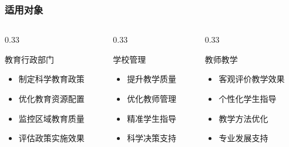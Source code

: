 \documentclass[aspectratio=169]{beamer}
\begin{document}
\begin{frame}
    \frametitle{适用对象}
    \begin{columns}
        \begin{column}{0.33\textwidth}
            \begin{block}{教育行政部门}
                \begin{itemize}
                    \item 制定科学教育政策
                    \item 优化教育资源配置
                    \item 监控区域教育质量
                    \item 评估政策实施效果
                \end{itemize}
            \end{block}
        \end{column}
        
        \begin{column}{0.33\textwidth}
            \begin{block}{学校管理}
                \begin{itemize}
                    \item 提升教学质量
                    \item 优化教师管理
                    \item 精准学生指导
                    \item 科学决策支持
                \end{itemize}
            \end{block}
        \end{column}
        
        \begin{column}{0.33\textwidth}
            \begin{block}{教师教学}
                \begin{itemize}
                    \item 客观评价教学效果
                    \item 个性化学生指导
                    \item 教学方法优化
                    \item 专业发展支持
                \end{itemize}
            \end{block}
        \end{column}
    \end{columns}
\end{frame}
\end{document}
